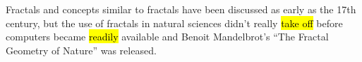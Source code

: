 Fractals and concepts similar to fractals have been discussed as early as the 17th century, but the use of fractals in natural sciences didn't really \hl{take off} before computers became \hl{readily} available and Benoit Mandelbrot's ``The Fractal Geometry of Nature''\cite{mandelbrot1983fractal} was released. 


% 
% 

